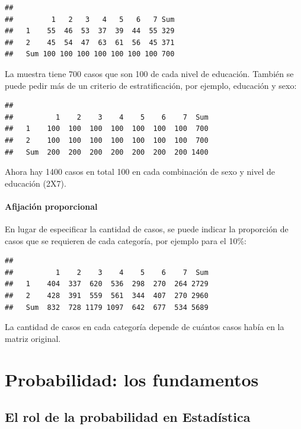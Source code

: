 \documentclass[]{book}
\begin{document}
\begin{verbatim}
##      
##         1   2   3   4   5   6   7 Sum
##   1    55  46  53  37  39  44  55 329
##   2    45  54  47  63  61  56  45 371
##   Sum 100 100 100 100 100 100 100 700
\end{verbatim}

La muestra tiene 700 casos que son 100 de cada nivel de educación. También se puede pedir más de un criterio de estratificación, por ejemplo, educación y sexo:

\begin{verbatim}
##      
##          1    2    3    4    5    6    7  Sum
##   1    100  100  100  100  100  100  100  700
##   2    100  100  100  100  100  100  100  700
##   Sum  200  200  200  200  200  200  200 1400
\end{verbatim}

Ahora hay 1400 casos en total 100 en cada combinación de sexo y nivel de educación (2X7).

\hypertarget{afijaciuxf3n-proporcional}{%
\subsubsection{Afijación proporcional}\label{afijaciuxf3n-proporcional}}

En lugar de especificar la cantidad de casos, se puede indicar la proporción de casos que se requieren de cada categoría, por ejemplo para el 10\%:

\begin{verbatim}
##      
##          1    2    3    4    5    6    7  Sum
##   1    404  337  620  536  298  270  264 2729
##   2    428  391  559  561  344  407  270 2960
##   Sum  832  728 1179 1097  642  677  534 5689
\end{verbatim}

La cantidad de casos en cada categoría depende de cuántos casos había en la matriz original.

\hypertarget{probabilidad-los-fundamentos}{%
\chapter{Probabilidad: los fundamentos}\label{probabilidad-los-fundamentos}}

\hypertarget{el-rol-de-la-probabilidad-en-estaduxedstica}{%
\section{El rol de la probabilidad en Estadística}\label{el-rol-de-la-probabilidad-en-estaduxedstica}}
\end{document}
